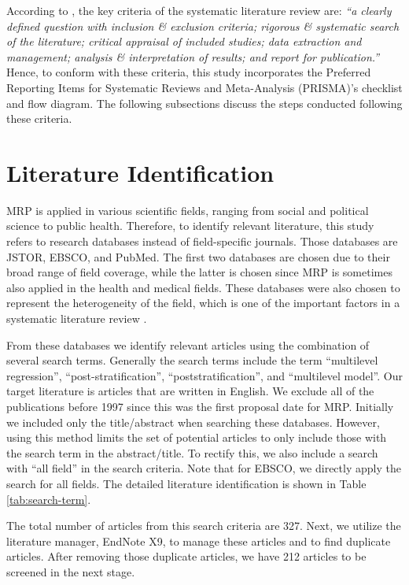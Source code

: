 \documentclass{monashthesis}
\begin{document}
According to \textcite{brown_uni}, the key criteria of the systematic literature review are: \emph{``a clearly defined question with inclusion \& exclusion criteria; rigorous \& systematic search of the literature; critical appraisal of included studies; data extraction and management; analysis \& interpretation of results; and report for publication.''} Hence, to conform with these criteria, this study incorporates the Preferred Reporting Items for Systematic Reviews and Meta-Analysis (PRISMA)'s checklist and flow diagram. The following subsections discuss the steps conducted following these criteria.

\hypertarget{literature-identification}{%
\section{Literature Identification}\label{literature-identification}}

MRP is applied in various scientific fields, ranging from social and political science to public health. Therefore, to identify relevant literature, this study refers to research databases instead of field-specific journals. Those databases are JSTOR, EBSCO, and PubMed. The first two databases are chosen due to their broad range of field coverage, while the latter is chosen since MRP is sometimes also applied in the health and medical fields. These databases were also chosen to represent the heterogeneity of the field, which is one of the important factors in a systematic literature review \autocite{SchweizerMarinL2017Apgt}.

From these databases we identify relevant articles using the combination of several search terms. Generally the search terms include the term ``multilevel regression'', ``post-stratification'', ``poststratification'', and ``multilevel model''. Our target literature is articles that are written in English. We exclude all of the publications before 1997 since this was the first proposal date for MRP. Initially we included only the title/abstract when searching these databases. However, using this method limits the set of potential articles to only include those with the search term in the abstract/title. To rectify this, we also include a search with ``all field'' in the search criteria. Note that for EBSCO, we directly apply the search for all fields. The detailed literature identification is shown in Table \ref{tab:search-term}.

The total number of articles from this search criteria are 327. Next, we utilize the literature manager, EndNote X9, to manage these articles and to find duplicate articles. After removing those duplicate articles, we have 212 articles to be screened in the next stage.
\end{document}
